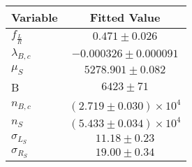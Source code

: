\begin{tabular}[t]{lc}
\hline
Variable &Fitted Value\\
\hline\hline
$f_{\frac{L}{R}}$&$0.471\pm0.026$\\
\hline
$\lambda_{B,c}$&$-0.000326\pm0.000091$\\
\hline
$\mu_S$&$5278.901\pm0.082$\\
\hline
B&$6423\pm71$\\
\hline
$n_{B,c}$&$(2.719\pm0.030)\times 10^4$\\
\hline
$n_S$&$(5.433\pm0.034)\times 10^4$\\
\hline
$\sigma_{L_S}$&$11.18\pm0.23$\\
\hline
$\sigma_{R_S}$&$19.00\pm0.34$\\
\hline
\end{tabular}